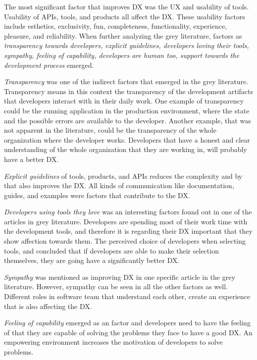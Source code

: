 \documentclass[english, 12pt, a4paper, sci, utf8, a-1b, online]{aaltothesis}
\begin{document}
The most significant factor that improves DX was the UX and usability of tools. Usability of APIs, tools, and products all affect the DX. These usability factors include esthetics, exclusivity, fun, completeness, functionality, experience, pleasure, and reliability. When further analyzing the grey literature, factors as \textit{transparency towards developers, explicit guidelines, developers loving their tools, sympathy, feeling of capability, developers are human too, support towards the development process} emerged.

\textit{Transparency} was one of the indirect factors that emerged in the grey literature. Transparency means in this context the transparency of the development artifacts that developers interact with in their daily work. One example of transparency could be the running application in the production environment, where the state and the possible errors are available to the developer. Another example, that was not apparent in the literature, could be the transparency of the whole organization where the developer works. Developers that have a honest and clear understanding of the whole organization that they are working in, will probably have a better DX.

\textit{Explicit guidelines} of tools, products, and APIs reduces the complexity and by that also improves the DX. All kinds of communication like documentation, guides, and examples were factors that contribute to the DX.

\textit{Developers using tools they love} was an interesting factors found out in one of the articles in grey literature. Developers are spending most of their work time with the development tools, and therefore it is regarding their DX important that they show affection towards them. The perceived choice of developers when selecting tools, and concluded that if developers are able to make their selection themselves, they are going have a significantly better DX.

\textit{Sympathy} was mentioned as improving DX in one specific article in the grey literature. However, sympathy can be seen in all the other factors as well. Different roles in software team that understand each other, create an experience that is also affecting the DX.

\textit{Feeling of capability} emerged as an factor and developers need to have the feeling of that they are capable of solving the problems they face to have a good DX. An empowering environment increases the motivation of developers to solve problems.
\end{document}

